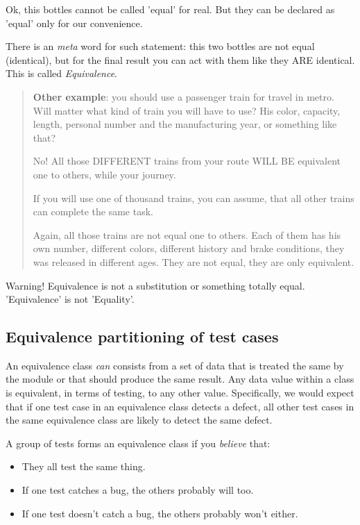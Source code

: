 Ok, this bottles cannot be called 'equal' for real. But they can be declared as 'equal' only for our convenience.

There is an \emph{meta} word for such statement: this two bottles are not equal (identical), but for the final result you can act with them like they ARE identical. This is called \emph{Equivalence}.

\begin{quote}
 
\textbf{Other example}: you should use a passenger train for travel in metro. Will matter what kind of train you will have to use? His color, capacity, length, personal number and the manufacturing year, or something like that?

No! All those DIFFERENT trains from your route WILL BE equivalent one to others, while your journey.

If you will use one of thousand trains, you can assume, that all other trains can complete the same task.

Again, all those trains are not equal one to others. Each of them has his own number, different colors, different history and brake conditions, they was released in different ages. They are not equal, they are only equivalent.
\end{quote}

Warning! Equivalence is not a substitution or something totally equal. 'Equivalence' is not 'Equality'.


\subsection{Equivalence partitioning of test cases}

An equivalence class \emph{can} consists from a set of data that is treated the same by the module or that should produce the same result. Any data value within a class is equivalent, in terms of testing, to any other value. Specifically, we would expect that if one test case in an equivalence class detects a defect, all other test cases in the same equivalence class are likely to detect the same defect.

A group of tests forms an equivalence class if you \emph{believe} that:

\begin{itemize}
\item 
They all test the same thing.
\item 
If one test catches a bug, the others probably will too.
\item 
If one test doesn't catch a bug, the others probably won't either.
\end{itemize}

